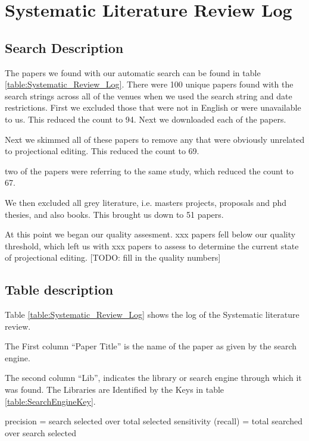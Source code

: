 \chapter{Systematic Literature Review Log} \label{Appendix:SLRLog}

\section{Search Description} 
The papers we found with our automatic search can be found in table \ref{table:Systematic_Review_Log}.
There were 100 unique papers found with the search strings across all of the venues when we used the search string and date restrictions.  
First we excluded those that were not in English or were unavailable to us.
This reduced the count to 94.
Next we downloaded each of the papers. 

Next we skimmed all of these papers to remove any that were obviously unrelated to projectional editing.
This reduced the count to 69.

two of the papers were referring to the same study, which reduced the count to 67.

We then excluded all grey literature, i.e. masters projects, proposals and phd thesies, and also books.
This brought us down to 51 papers.

At this point we began our quality assesment.
xxx papers fell below our quality threshold, which left us with xxx papers to assess to determine the current state of projectional editing.
[TODO: fill in the quality numbers]

\section{Table description}
Table \ref{table:Systematic_Review_Log} shows the log of the Systematic literature review.

The First column ``Paper Title'' is the name of the paper as given by the search engine.

The second column ``Lib'', indicates the library or search engine through which it was found.  
The Libraries are Identified by the Keys in table \ref{table:SearchEngineKey}.

precision = search selected over total selected
sensitivity (recall) = total searched over search selected

